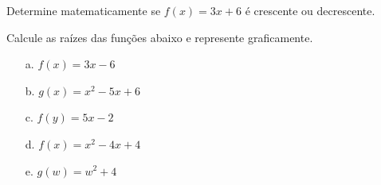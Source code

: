 \begin{exercise}
	Determine matematicamente se $f(x) = 3x + 6$ é crescente ou decrescente.
\end{exercise}

\begin{exercise}
	Calcule as raízes das funções abaixo e represente graficamente.
	\begin{itemize}
		\item[a.]{$f(x) = 3x - 6$}
		\item[b.]{$g(x) = x^2-5x+6$}
		\item[c.]{$f(y) = 5x - 2$}
		\item[d.]{$f(x) = x^2-4x+4$}
		\item[e.]{$g(w) = w^2+4$}
	\end{itemize}
\end{exercise}